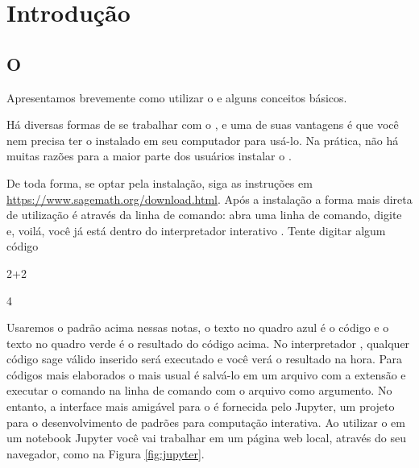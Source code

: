 \mainmatter

\chapter*{Introdução}

\section*{O \sage}

Apresentamos brevemente como utilizar o \sage e alguns conceitos
básicos.

Há diversas formas de se trabalhar com o \sage, e uma de suas vantagens
é que você nem precisa ter o \sage instalado em seu computador 
para usá-lo. Na prática, não há muitas razões para a maior parte
dos usuários instalar o \sage. 

De toda forma, se optar pela
instalação, siga as instruções em \url{https://www.sagemath.org/download.html}.
Após a instalação a forma mais direta de utilização é através
da linha de comando: abra uma linha de comando, digite 
e, voilá, você já está dentro do interpretador interativo \sage.
Tente digitar algum código

\begin{sageinput}
2+2
\end{sageinput}
\begin{sageoutput}
4
\end{sageoutput}

Usaremos o padrão acima nessas notas, o texto no quadro azul
é o código \sage e o texto no quadro verde é o resultado do código
acima. 
No interpretador \sage, qualquer código sage válido inserido
será executado e você verá o resultado na hora. Para 
códigos mais elaborados o mais usual é salvá-lo em um arquivo com a extensão
 e executar o comando  na linha de comando
com o arquivo como argumento. No entanto, a interface mais amigável para o
\sage é fornecida pelo Jupyter, um projeto para o desenvolvimento de padrões
para computação interativa. Ao utilizar o \sage em um notebook Jupyter
você vai trabalhar em um página web local, através do seu navegador,
como na Figura \ref{fig:jupyter}.

